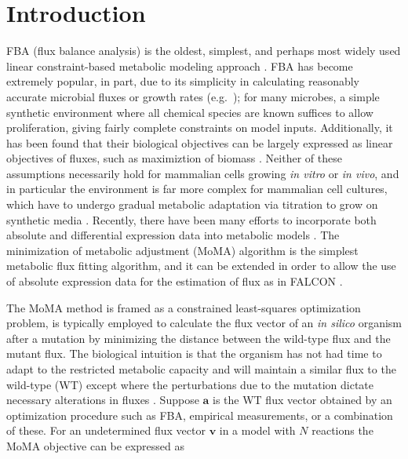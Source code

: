 \section{Introduction}

%
%
FBA (flux balance analysis) is the oldest, simplest, and perhaps
most widely used linear constraint-based metabolic modeling approach
\citep{Shestov2013a,Lewis2012}. FBA has become extremely popular, in
part, due to its simplicity in calculating reasonably accurate
microbial fluxes or growth rates
(e.g.\ \citealt{Schuetz2012,Fong2004_sb2013}); for
many microbes, a simple synthetic environment where all chemical
species are known suffices to allow proliferation, giving fairly
complete constraints on model inputs. Additionally, it has been found
that their biological objectives can be largely expressed as linear
objectives of fluxes, such as maximiztion of biomass \citep{Schuetz2012}. 
Neither of these assumptions necessarily hold for mammalian cells growing \textit{in
  vitro} or \textit{in vivo}, and in particular the environment is far
more complex for mammalian cell cultures, which have to undergo
gradual metabolic adaptation via titration to grow on synthetic media
\citep{Pirkmajer2011}. Recently, there have been many efforts to
incorporate both absolute and differential expression data into
metabolic models \citep{Blazier2012}. The minimization of metabolic
adjustment (MoMA) algorithm is the simplest metabolic flux fitting
algorithm, and it can be extended in order to allow the use of
absolute expression data for the estimation of flux as in FALCON
\citep{Segre2002,Lee2012}.


The MoMA method is framed as a constrained least-squares optimization
problem, is typically employed to calculate the flux vector of an
\textit{in silico} organism after a mutation by minimizing the distance
between the wild-type flux and the mutant flux. The biological
intuition is that the organism has not had time to adapt to the
restricted metabolic capacity and will maintain a similar flux to the
wild-type (WT) except where the perturbations due to the mutation
dictate necessary alterations in fluxes \citep{Shlomi2005}. Suppose
$\mathbf{a}$ is the WT flux vector obtained by an optimization
procedure such as FBA, empirical measurements, or a combination of
these. For an undetermined flux vector $\mathbf{v}$ in a model with
$N$ reactions the MoMA objective can be expressed as

